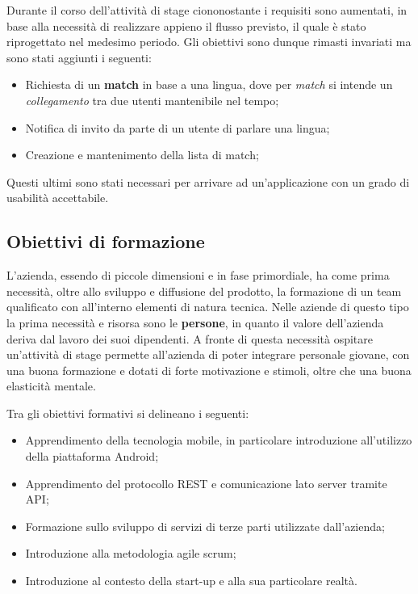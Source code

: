 Durante il corso dell'attività di stage ciononostante i requisiti sono aumentati, in base alla necessità di realizzare appieno il flusso previsto, il quale è stato riprogettato nel medesimo periodo. Gli obiettivi sono dunque rimasti invariati ma sono stati aggiunti i seguenti:

\begin{itemize}

\item Richiesta di un \textbf{match} in base a una lingua, dove per \textit{match} si intende un \textit{collegamento} tra due utenti mantenibile nel tempo;
\item Notifica di invito da parte di un utente di parlare una lingua;
\item Creazione e mantenimento della lista di match;

\end{itemize}

Questi ultimi sono stati necessari per arrivare ad un'applicazione con un grado di usabilità accettabile.

\subsection{Obiettivi di formazione}

L'azienda, essendo di piccole dimensioni e in fase primordiale, ha come prima necessità, oltre allo sviluppo e diffusione del prodotto, la formazione di un team qualificato con all'interno elementi di natura tecnica.  Nelle aziende di questo tipo la prima necessità e risorsa sono le \textbf{persone}, in quanto il valore dell'azienda deriva dal lavoro dei suoi dipendenti. A fronte di questa necessità ospitare un'attività di stage permette all'azienda di poter integrare personale giovane, con una buona formazione e dotati di forte motivazione e stimoli, oltre che una buona elasticità mentale. 

Tra gli obiettivi formativi si delineano i seguenti:

\begin{itemize}

\item Apprendimento della tecnologia mobile, in particolare introduzione all'utilizzo della piattaforma Android;
\item Apprendimento del protocollo REST e comunicazione lato server tramite API;
\item Formazione sullo sviluppo di servizi di terze parti utilizzate dall'azienda; 
\item Introduzione alla metodologia agile scrum;
\item Introduzione al contesto della start-up e alla sua particolare realtà.

\end{itemize}

